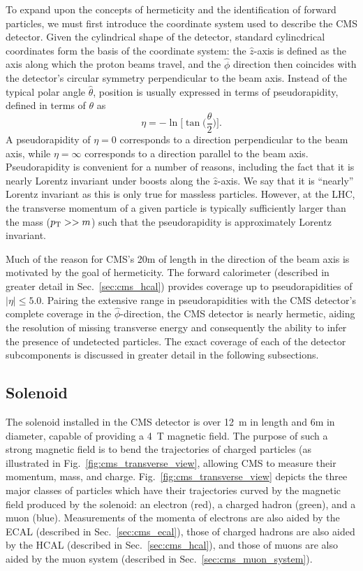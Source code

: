 To expand upon the concepts of hermeticity and the identification of forward particles, we must first introduce the coordinate system used to describe the CMS detector.
Given the cylindrical shape of the detector, standard cylincdrical coordinates form the basis of the coordinate system: the $\hat{z}$-axis is defined as the axis along which the proton beams travel, and the $\hat{\phi}$ direction then coincides with the detector's circular symmetry perpendicular to the beam axis.
Instead of the typical polar angle $\hat{\theta}$, position is usually expressed in terms of pseudorapidity, defined in terms of $\theta$ as
\begin{equation}
    \eta = -\ln \Bigg[ \tan \bigg(\frac{\theta}{2}\bigg) \Bigg].
\end{equation}
A pseudorapidity of $\eta = 0$ corresponds to a direction perpendicular to the beam axis, while $\eta = \infty$ corresponds to a direction parallel to the beam axis.
Pseudorapidity is convenient for a number of reasons, including the fact that it is nearly Lorentz invariant under boosts along the $\hat{z}$-axis.
We say that it is ``nearly'' Lorentz invariant as this is only true for massless particles.
However, at the LHC, the transverse momentum of a given particle is typically sufficiently larger than the mass ($p_{\mathrm{T}} >> m$) such that the pseudorapidity is approximately Lorentz invariant. 

Much of the reason for CMS's 20m of length in the direction of the beam axis is motivated by the goal of hermeticity.
The forward calorimeter (described in greater detail in Sec.~\ref{sec:cms_hcal}) provides coverage up to pseudorapidities of $|\eta| \leq 5.0$.
Pairing the extensive range in pseudorapidities with the CMS detector's complete coverage in the $\hat{\phi}$-direction, the CMS detector is nearly hermetic, aiding the resolution of missing transverse energy and consequently the ability to infer the presence of undetected particles.
The exact coverage of each of the detector subcomponents is discussed in greater detail in the following subsections.

\subsection{Solenoid}
The solenoid installed in the CMS detector is over 12~m in length and 6m in diameter, capable of providing a 4~T magnetic field.
The purpose of such a strong magnetic field is to bend the trajectories of charged particles (as illustrated in Fig.~\ref{fig:cms_transverse_view}, allowing CMS to measure their momentum, mass, and charge.
Fig.~\ref{fig:cms_transverse_view} depicts the three major classes of particles which have their trajectories curved by the magnetic field produced by the solenoid: an electron (red), a charged hadron (green), and a muon (blue).
Measurements of the momenta of electrons are also aided by the ECAL (described in Sec.~\ref{sec:cms_ecal}), those of charged hadrons are also aided by the HCAL (described in Sec.~\ref{sec:cms_hcal}), and those of muons are also aided by the muon system (described in Sec.~\ref{sec:cms_muon_system}).

